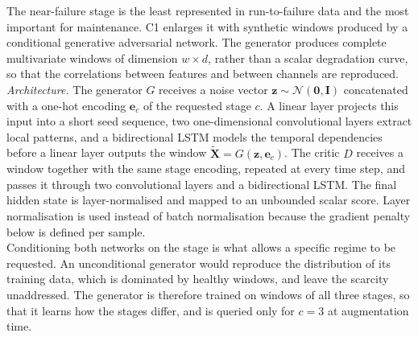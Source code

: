 The near-failure stage is the least represented in run-to-failure data
and the most important for maintenance. C1 enlarges it with synthetic
windows produced by a conditional generative adversarial network. The
generator produces complete multivariate windows of dimension
$w \times d$, rather than a scalar degradation curve, so that the
correlations between features and between channels are reproduced.\\

\textit{Architecture.} The generator $G$ receives a noise vector
$\mathbf{z} \sim \mathcal{N}(\mathbf{0}, \mathbf{I})$ concatenated with
a one-hot encoding $\mathbf{e}_c$ of the requested stage $c$. A linear
layer projects this input into a short seed sequence, two
one-dimensional convolutional layers extract local patterns, and a
bidirectional LSTM models the temporal dependencies before a linear
layer outputs the window $\tilde{\mathbf{X}} = G(\mathbf{z},
\mathbf{e}_c)$. The critic $D$ receives a window together with the same
stage encoding, repeated at every time step, and passes it through two
convolutional layers and a bidirectional LSTM. The final hidden state
is layer-normalised and mapped to an unbounded scalar score. Layer
normalisation is used instead of batch normalisation because the
gradient penalty below is defined per sample.\\

Conditioning both networks on the stage is what allows a specific
regime to be requested. An unconditional generator would reproduce the
distribution of its training data, which is dominated by healthy
windows, and leave the scarcity unaddressed. The generator is
therefore trained on windows of all three stages, so that it learns
how the stages differ, and is queried only for $c = 3$ at
augmentation time.\\

